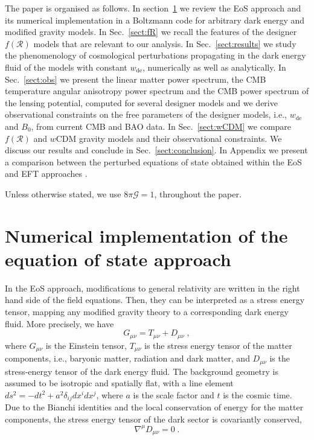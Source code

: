 \documentclass[nofootinbib,a4paper,aps,prd,10pt,superscriptaddress,reprint,showkeys,showpacs]{revtex4-1}
\newcommand{\qsubrm}[2]{{#1}_{\scriptscriptstyle{\textrm{#2}}}}
\def\be{\begin{equation}}
\def\ee{\end{equation}}
\begin{document}
The paper is organised as follows. In section~\ref{sect:EoS} we review the EoS approach and its numerical 
implementation in a Boltzmann code for arbitrary dark energy and modified gravity models. In Sec.~\ref{sect:fR} we 
recall the features of the designer $f(\mathcal{R})$ models that are relevant to our analysis. 
In Sec.~\ref{sect:results} we study the phenomenology of cosmological perturbations propagating in the dark energy 
fluid of the models with constant $\qsubrm{w}{de}$, numerically as well as analytically. In Sec.~\ref{sect:obs} we 
present the linear matter power spectrum, the CMB temperature angular anisotropy power spectrum and the CMB power 
spectrum of the lensing potential, computed for several designer models and we derive observational constraints on the 
free parameters of the designer models, i.e., $\qsubrm{w}{de}$ and $\qsubrm{B}{0}$, from current CMB and BAO data. 
In Sec.~\ref{sect:wCDM} we compare $f(\mathcal{R})$ and $w$CDM gravity models and their observational 
constraints. We discuss our results and conclude in Sec.~\ref{sect:conclusion}. In Appendix we present a comparison 
between the perturbed equations of state obtained within the EoS \citep{Battye2016} and EFT 
approaches \citep{Gleyzes2013,Gleyzes2014}.

Unless otherwise stated, we use $8\pi\mathcal{G}=1$, throughout the paper.


\section{Numerical implementation of the equation of state approach}\label{sect:EoS}
In the EoS approach, modifications to general relativity are written in the right hand side of the field equations. 
Then, they can be interpreted as a stress energy tensor, mapping any modified gravity theory to a corresponding dark 
energy fluid. More precisely, we have
\be
 G_{\mu\nu}=T_{\mu\nu}+D_{\mu\nu}\;, \label{eq:fe}
\ee
where $G_{\mu\nu}$ is the Einstein tensor, $T_{\mu\nu}$ is the stress energy tensor of the matter components, i.e., 
baryonic matter, radiation and dark matter, and $D_{\mu\nu}$ is the stress-energy tensor of the dark energy fluid. The 
background geometry is assumed to be isotropic and spatially flat, with a line element 
$ds^2 = -dt^2 + a^2 \delta_{ij} dx^idx^j$, where $a$ is the scale factor and $t$ is the cosmic time. Due to the Bianchi 
identities and the local conservation of energy for the matter components, the stress energy tensor of the dark sector 
is covariantly conserved,
\be
 \nabla^\mu D_{\mu\nu}=0\;. \label{eq:bi}
\ee
\end{document}
